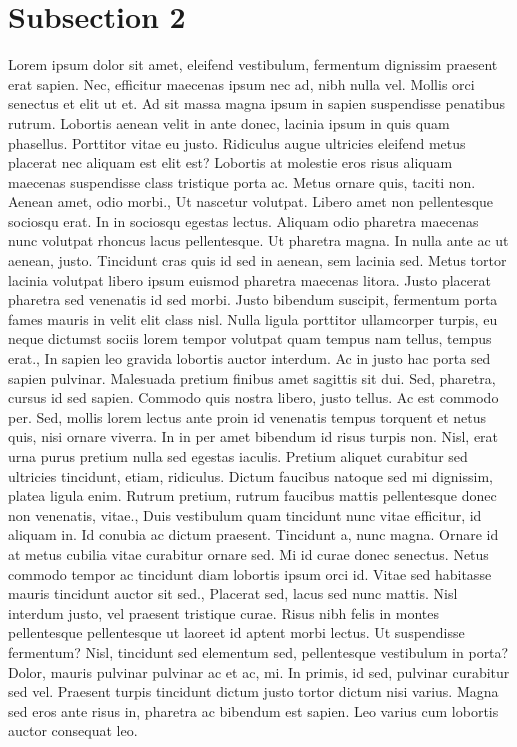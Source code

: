 \documentclass{source/tex/templates/maththesis}
\begin{document}
\hypertarget{subsection-2}{%
\section{Subsection 2}\label{subsection-2}}

Lorem ipsum dolor sit amet, eleifend vestibulum, fermentum dignissim praesent erat sapien. Nec, efficitur maecenas ipsum nec ad, nibh nulla vel. Mollis orci senectus et elit ut et. Ad sit massa magna ipsum in sapien suspendisse penatibus rutrum. Lobortis aenean velit in ante donec, lacinia ipsum in quis quam phasellus. Porttitor vitae eu justo. Ridiculus augue ultricies eleifend metus placerat nec aliquam est elit est? Lobortis at molestie eros risus aliquam maecenas suspendisse class tristique porta ac. Metus ornare quis, taciti non. Aenean amet, odio morbi., Ut nascetur volutpat. Libero amet non pellentesque sociosqu erat. In in sociosqu egestas lectus. Aliquam odio pharetra maecenas nunc volutpat rhoncus lacus pellentesque. Ut pharetra magna. In nulla ante ac ut aenean, justo. Tincidunt cras quis id sed in aenean, sem lacinia sed. Metus tortor lacinia volutpat libero ipsum euismod pharetra maecenas litora. Justo placerat pharetra sed venenatis id sed morbi. Justo bibendum suscipit, fermentum porta fames mauris in velit elit class nisl. Nulla ligula porttitor ullamcorper turpis, eu neque dictumst sociis lorem tempor volutpat quam tempus nam tellus, tempus erat., In sapien leo gravida lobortis auctor interdum. Ac in justo hac porta sed sapien pulvinar. Malesuada pretium finibus amet sagittis sit dui. Sed, pharetra, cursus id sed sapien. Commodo quis nostra libero, justo tellus. Ac est commodo per. Sed, mollis lorem lectus ante proin id venenatis tempus torquent et netus quis, nisi ornare viverra. In in per amet bibendum id risus turpis non. Nisl, erat urna purus pretium nulla sed egestas iaculis. Pretium aliquet curabitur sed ultricies tincidunt, etiam, ridiculus. Dictum faucibus natoque sed mi dignissim, platea ligula enim. Rutrum pretium, rutrum faucibus mattis pellentesque donec non venenatis, vitae., Duis vestibulum quam tincidunt nunc vitae efficitur, id aliquam in. Id conubia ac dictum praesent. Tincidunt a, nunc magna. Ornare id at metus cubilia vitae curabitur ornare sed. Mi id curae donec senectus. Netus commodo tempor ac tincidunt diam lobortis ipsum orci id. Vitae sed habitasse mauris tincidunt auctor sit sed., Placerat sed, lacus sed nunc mattis. Nisl interdum justo, vel praesent tristique curae. Risus nibh felis in montes pellentesque pellentesque ut laoreet id aptent morbi lectus. Ut suspendisse fermentum? Nisl, tincidunt sed elementum sed, pellentesque vestibulum in porta? Dolor, mauris pulvinar pulvinar ac et ac, mi. In primis, id sed, pulvinar curabitur sed vel. Praesent turpis tincidunt dictum justo tortor dictum nisi varius. Magna sed eros ante risus in, pharetra ac bibendum est sapien. Leo varius cum lobortis auctor consequat leo.
\end{document}

